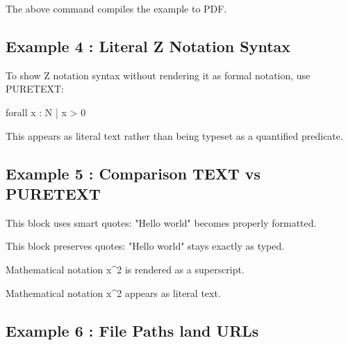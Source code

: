 \documentclass[a4paper,10pt,fleqn]{article}
\begin{document}
\bigskip

\bigskip

The above command compiles the example to PDF.

\bigskip

\subsection*{Example 4 : Literal Z Notation Syntax}

\bigskip

To show Z notation syntax without rendering it as formal notation, use PURETEXT:

\bigskip

\bigskip

forall x : N | x > 0

\bigskip

\bigskip

This appears as literal text rather than being typeset as a quantified predicate.

\bigskip

\subsection*{Example 5 : Comparison TEXT vs PURETEXT}

\noindent This block uses smart quotes: "Hello world" becomes properly formatted.

\bigskip

\bigskip

This block preserves quotes: "Hello world" stays exactly as typed.

\bigskip

\noindent Mathematical notation x\textasciicircum{}2 is rendered as a superscript.

\bigskip

\bigskip

Mathematical notation x\textasciicircum{}2 appears as literal text.

\bigskip

\subsection*{Example 6 : File Paths land URLs}

\bigskip
\end{document}
